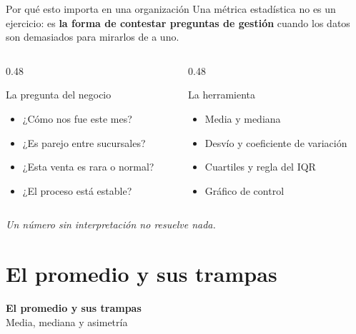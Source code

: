 \documentclass[aspectratio=169,10pt]{beamer}
\begin{document}
\begin{frame}{Por qué esto importa en una organización}
  Una métrica estadística no es un ejercicio: es \textbf{la forma de contestar preguntas de gestión}
  cuando los datos son demasiados para mirarlos de a uno.

  \vspace{0.6em}
  \begin{columns}[T]
    \begin{column}{0.48\textwidth}
      \begin{block}{La pregunta del negocio}
        \begin{itemize}
          \item ¿Cómo nos fue este mes?
          \item ¿Es parejo entre sucursales?
          \item ¿Esta venta es rara o normal?
          \item ¿El proceso está estable?
        \end{itemize}
      \end{block}
    \end{column}
    \begin{column}{0.48\textwidth}
      \begin{block}{La herramienta}
        \begin{itemize}
          \item Media y mediana
          \item Desvío y coeficiente de variación
          \item Cuartiles y regla del IQR
          \item Gráfico de control
        \end{itemize}
      \end{block}
    \end{column}
  \end{columns}
  \vspace{0.4em}
  \begin{center}\emph{Un número sin interpretación no resuelve nada.}\end{center}
\end{frame}

\section{El promedio y sus trampas}

{
\begin{frame}[plain]
  \begin{center}
    {\Huge\bfseries\color{violetaOscuro} El promedio y sus trampas}\\[0.6em]
    {\large Media, mediana y asimetría}
  \end{center}
\end{frame}}
\end{document}
